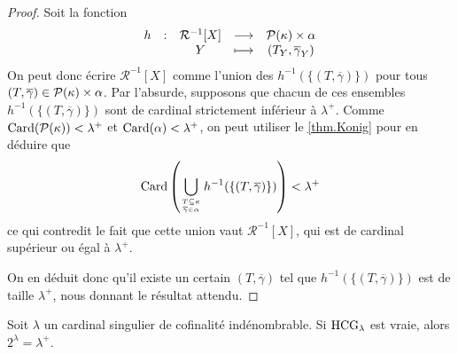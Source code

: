 \begin{proof}
  Soit la fonction
  \[\begin{array}{ccccc}
  h & : & \mathcal R^{-1}[X] & \longrightarrow & \mathcal{P}(\kappa)\times\alpha\\
  & & Y & \longmapsto & (T_Y,\overline\gamma_Y)
  \end{array}\]
  On peut donc écrire $\mathcal R^{-1}[X]$ comme l'union des
  $h^{-1}(\{(T,\overline\gamma)\})$ pour tous
  $(T,\overline\gamma)\in\mathcal{P}(\kappa)\times\alpha$. Par l'absurde,
  supposons que chacun de ces ensembles $h^{-1}(\{(T,\overline\gamma)\})$ sont
  de cardinal strictement inférieur à $\lambda^+$. Comme
  $\operatorname{Card}(\mathcal{P}(\kappa)) < \lambda^+$ et $\operatorname{Card}(\alpha) < \lambda^+$, on
  peut utiliser le \cref{thm.Konig} pour en déduire que
  \[\operatorname{Card}\left(\bigcup_{{T\subseteq \kappa} \atop {\overline\gamma\in \alpha}}
  h^{-1}(\{(T,\overline\gamma)\})\right) < \lambda^+\]
  ce qui contredit le fait que cette union vaut $\mathcal R^{-1}[X]$, qui est
  de cardinal supérieur ou égal à $\lambda^+$.

  On en déduit donc qu'il existe un certain $(T,\overline\gamma)$ tel que
  $h^{-1}(\{(T,\overline\gamma)\})$ est de taille $\lambda^+$, nous donnant le
  résultat attendu.
\end{proof}

\begin{theorem}[Silver]
  Soit $\lambda$ un cardinal singulier de cofinalité indénombrable. Si
  $\operatorname{HCG}_\lambda$ est vraie, alors $2^\lambda = \lambda^+$.
\end{theorem}

